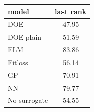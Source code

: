 \begin{tabular}{|lc|}
\hline
model & last rank\\
\hline
DOE & 47.95 \\
DOE plain & 51.59 \\
ELM & 83.86 \\
Fitloss & 56.14 \\
GP & 70.91 \\
NN & 79.77 \\
No surrogate & 54.55 \\
\hline
\end{tabular}
